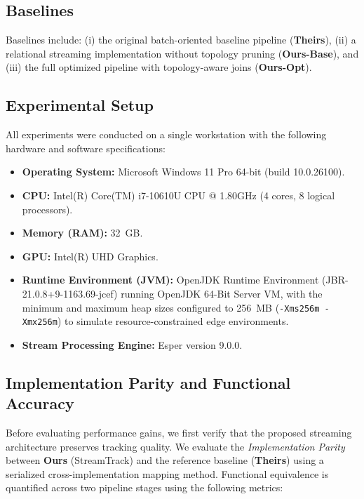 \documentclass[11pt]{article}
\begin{document}
\subsection{Baselines}

Baselines include: (i) the original batch-oriented baseline pipeline (\textbf{Theirs}), (ii) a relational streaming implementation without topology pruning (\textbf{Ours-Base}), and (iii) the full optimized pipeline with topology-aware joins (\textbf{Ours-Opt}).

\subsection{Experimental Setup}
All experiments were conducted on a single workstation with the following hardware and software specifications:
\begin{itemize}[leftmargin=*]
    \item \textbf{Operating System:} Microsoft Windows 11 Pro 64-bit (build 10.0.26100).
    \item \textbf{CPU:} Intel(R) Core(TM) i7-10610U CPU @ 1.80GHz (4 cores, 8 logical processors).
    \item \textbf{Memory (RAM):} 32~GB.
    \item \textbf{GPU:} Intel(R) UHD Graphics.
    \item \textbf{Runtime Environment (JVM):} OpenJDK Runtime Environment (JBR-21.0.8+9-1163.69-jcef) running OpenJDK 64-Bit Server VM, with the minimum and maximum heap sizes configured to 256~MB (\texttt{-Xms256m -Xmx256m}) to simulate resource-constrained edge environments.
    \item \textbf{Stream Processing Engine:} Esper version 9.0.0.
\end{itemize}

\subsection{Implementation Parity and Functional Accuracy}
Before evaluating performance gains, we first verify that the proposed streaming architecture preserves tracking quality. We evaluate the \emph{Implementation Parity} between \textbf{Ours} (StreamTrack) and the reference baseline (\textbf{Theirs}) using a serialized cross-implementation mapping method. Functional equivalence is quantified across two pipeline stages using the following metrics:
\end{document}
